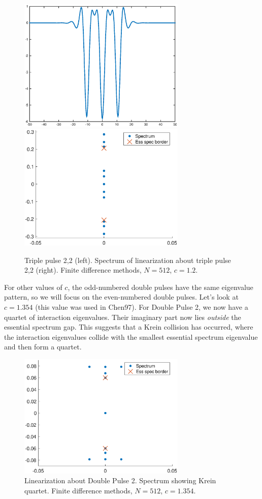 \documentclass[12pt]{article}
\begin{document}
\begin{figure}[H]
\centering
\includegraphics[width=8cm]{triple12_2.eps}
\includegraphics[width=8cm]{spec12_triple2.eps}
\caption{Triple pulse 2,2 (left). Spectrum of linearization about triple pulse 2,2 (right). Finite difference methods, $N = 512$, $c = 1.2$.}
\end{figure}

For other values of $c$, the odd-numbered double pulses have the same eigenvalue pattern, so we will focus on the even-numbered double pulses. Let's look at $c = 1.354$ (this value was used in Chen97). For Double Pulse 2, we now have a quartet of interaction eigenvalues. Their imaginary part now lies \emph{outside} the essential spectrum gap. This suggests that a Krein collision has occurred, where the interaction eigenvalues collide with the smallest essential spectrum eigenvalue and then form a quartet.

\begin{figure}[H]
\centering
\includegraphics[width=8cm]{spec1354_double2.eps}
\caption{Linearization about Double Pulse 2. Spectrum showing Krein quartet. Finite difference methods, $N = 512$, $c = 1.354$.}
\end{figure}
\end{document}
